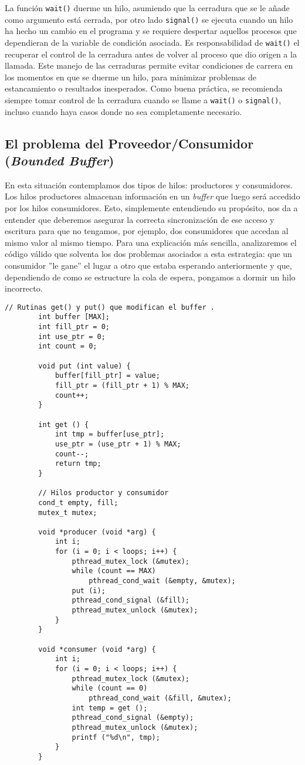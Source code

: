 \documentclass{article}
\begin{document}
	La función \lstinline|wait()| duerme un hilo, asumiendo que la cerradura que se le añade como argumento está cerrada, por otro lado \lstinline|signal()| se ejecuta cuando un hilo ha hecho un cambio en el programa y se requiere despertar aquellos procesos que dependieran de la variable de condición asociada. Es responsabilidad de \lstinline|wait()| el recuperar el control de la cerradura antes de volver al proceso que dio origen a la llamada. Este manejo de las cerraduras permite evitar condiciones de carrera en los momentos en que se duerme un hilo, para minimizar problemas de estancamiento o resultados inesperados. Como buena práctica, se recomienda siempre tomar control de la cerradura cuando se llame a \lstinline|wait()| o \lstinline|signal()|, incluso cuando haya casos donde no sea completamente necesario.
	
	\subsection{El problema del Proveedor/Consumidor (\textit{Bounded Buffer})}
	En esta situación contemplamos dos tipos de hilos: productores y consumidores. Los hilos productores almacenan información en un \textit{buffer} que luego será accedido por los hilos consumidores. Esto, simplemente entendiendo su propósito, nos da a entender que deberemos asegurar la correcta sincronización de ese acceso y escritura para que no tengamos, por ejemplo, dos consumidores que accedan al mismo valor al mismo tiempo. Para una explicación más sencilla, analizaremos el código válido que solventa los dos problemas asociados a esta estrategia: que un consumidor ”le gane” el
	lugar a otro que estaba esperando anteriormente y que, dependiendo de como se estructure la cola de espera, pongamos a dormir un hilo incorrecto.
	
	\begin{lstlisting}[caption=Implementación correcta de la solución al problema Proveedor/Consumidor]
		// Rutinas get() y put() que modifican el buffer .
		int buffer [MAX];
		int fill_ptr = 0;
		int use_ptr = 0;
		int count = 0;

		void put (int value) {
			buffer[fill_ptr] = value;
			fill_ptr = (fill_ptr + 1) % MAX;
			count++;
		}

		int get () {
			int tmp = buffer[use_ptr];
			use_ptr = (use_ptr + 1) % MAX;
			count--;
			return tmp;
		}

		// Hilos productor y consumidor
		cond_t empty, fill;
		mutex_t mutex;

		void *producer (void *arg) {
			int i;
			for (i = 0; i < loops; i++) {
				pthread_mutex_lock (&mutex);
				while (count == MAX)
					pthread_cond_wait (&empty, &mutex);
				put (i);
				pthread_cond_signal (&fill);
				pthread_mutex_unlock (&mutex);
			}
		}

		void *consumer (void *arg) {
			int i;
			for (i = 0; i < loops; i++) {
				pthread_mutex_lock (&mutex);
				while (count == 0)
					pthread_cond_wait (&fill, &mutex);
				int temp = get ();
				pthread_cond_signal (&empty);
				pthread_mutex_unlock (&mutex);
				printf ("%d\n", tmp);
			}
		}
	\end{lstlisting}
	
\end{document}
